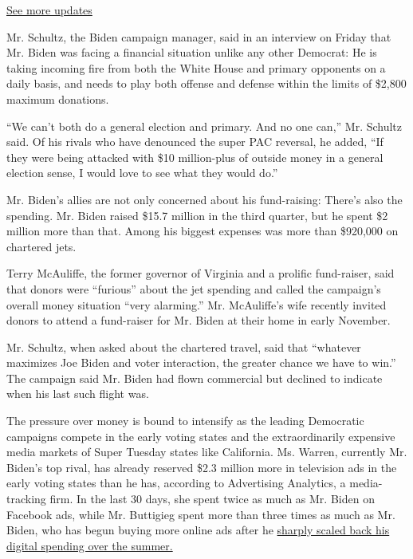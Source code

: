 \href{https://www.nytimes.com/2020/07/31/us/elections/biden-vs-trump.html?action=click\&pgtype=Article\&state=default\&region=MAIN_CONTENT_1\&context=storylines_live_updates}{See
more updates}

Mr. Schultz, the Biden campaign manager, said in an interview on Friday
that Mr. Biden was facing a financial situation unlike any other
Democrat: He is taking incoming fire from both the White House and
primary opponents on a daily basis, and needs to play both offense and
defense within the limits of \$2,800 maximum donations.

``We can't both do a general election and primary. And no one can,'' Mr.
Schultz said. Of his rivals who have denounced the super PAC reversal,
he added, ``If they were being attacked with \$10 million-plus of
outside money in a general election sense, I would love to see what they
would do.''

Mr. Biden's allies are not only concerned about his fund-raising:
There's also the spending. Mr. Biden raised \$15.7 million in the third
quarter, but he spent \$2 million more than that. Among his biggest
expenses was more than \$920,000 on chartered jets.

Terry McAuliffe, the former governor of Virginia and a prolific
fund-raiser, said that donors were ``furious'' about the jet spending
and called the campaign's overall money situation ``very alarming.'' Mr.
McAuliffe's wife recently invited donors to attend a fund-raiser for Mr.
Biden at their home in early November.

Mr. Schultz, when asked about the chartered travel, said that ``whatever
maximizes Joe Biden and voter interaction, the greater chance we have to
win.'' The campaign said Mr. Biden had flown commercial but declined to
indicate when his last such flight was.

The pressure over money is bound to intensify as the leading Democratic
campaigns compete in the early voting states and the extraordinarily
expensive media markets of Super Tuesday states like California. Ms.
Warren, currently Mr. Biden's top rival, has already reserved \$2.3
million more in television ads in the early voting states than he has,
according to Advertising Analytics, a media-tracking firm. In the last
30 days, she spent twice as much as Mr. Biden on Facebook ads, while Mr.
Buttigieg spent more than three times as much as Mr. Biden, who has
begun buying more online ads after he
\href{https://www.nytimes.com/2019/09/30/us/politics/joe-biden-ads.html}{sharply
scaled back his digital spending over the summer.}

